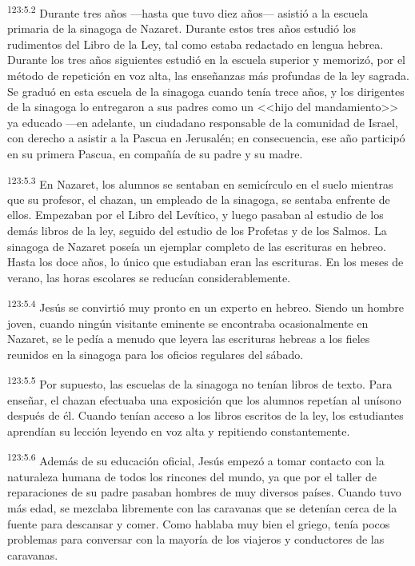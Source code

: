 \par 
\textsuperscript{123:5.2} Durante tres años ---hasta que tuvo diez años--- asistió a la escuela primaria de la sinagoga de Nazaret. Durante estos tres años estudió los rudimentos del Libro de la Ley, tal como estaba redactado en lengua hebrea. Durante los tres años siguientes estudió en la escuela superior y memorizó, por el método de repetición en voz alta, las enseñanzas más profundas de la ley sagrada. Se graduó en esta escuela de la sinagoga cuando tenía trece años, y los dirigentes de la sinagoga lo entregaron a sus padres como un <<hijo del mandamiento>> ya educado ---en adelante, un ciudadano responsable de la comunidad de Israel, con derecho a asistir a la Pascua en Jerusalén; en consecuencia, ese año participó en su primera Pascua, en compañía de su padre y su madre.

\par 
\textsuperscript{123:5.3} En Nazaret, los alumnos se sentaban en semicírculo en el suelo mientras que su profesor, el chazan, un empleado de la sinagoga, se sentaba enfrente de ellos. Empezaban por el Libro del Levítico, y luego pasaban al estudio de los demás libros de la ley, seguido del estudio de los Profetas y de los Salmos. La sinagoga de Nazaret poseía un ejemplar completo de las escrituras en hebreo. Hasta los doce años, lo único que estudiaban eran las escrituras. En los meses de verano, las horas escolares se reducían considerablemente.

\par 
\textsuperscript{123:5.4} Jesús se convirtió muy pronto en un experto en hebreo. Siendo un hombre joven, cuando ningún visitante eminente se encontraba ocasionalmente en Nazaret, se le pedía a menudo que leyera las escrituras hebreas a los fieles reunidos en la sinagoga para los oficios regulares del sábado.

\par 
\textsuperscript{123:5.5} Por supuesto, las escuelas de la sinagoga no tenían libros de texto. Para enseñar, el chazan efectuaba una exposición que los alumnos repetían al unísono después de él. Cuando tenían acceso a los libros escritos de la ley, los estudiantes aprendían su lección leyendo en voz alta y repitiendo constantemente.

\par 
\textsuperscript{123:5.6} Además de su educación oficial, Jesús empezó a tomar contacto con la naturaleza humana de todos los rincones del mundo, ya que por el taller de reparaciones de su padre pasaban hombres de muy diversos países. Cuando tuvo más edad, se mezclaba libremente con las caravanas que se detenían cerca de la fuente para descansar y comer. Como hablaba muy bien el griego, tenía pocos problemas para conversar con la mayoría de los viajeros y conductores de las caravanas.

